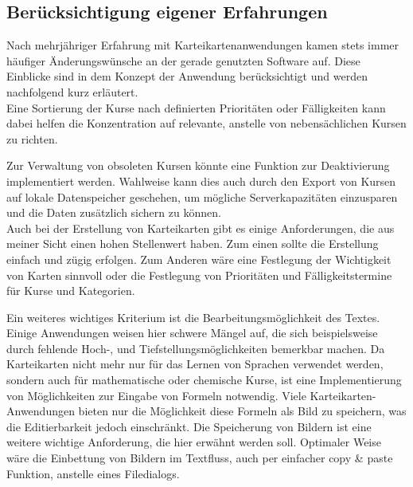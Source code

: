 
\subsection{Berücksichtigung eigener Erfahrungen}
Nach mehrjähriger Erfahrung mit Karteikartenanwendungen kamen stets immer häufiger Änderungswünsche an der gerade genutzten Software auf. Diese Einblicke sind in dem Konzept der Anwendung berücksichtigt und werden nachfolgend kurz erläutert. \\

Eine Sortierung der Kurse nach definierten Prioritäten oder Fälligkeiten kann dabei helfen die Konzentration auf relevante, anstelle von nebensächlichen Kursen zu richten.

Zur Verwaltung von obsoleten Kursen könnte eine Funktion zur Deaktivierung implementiert werden. Wahlweise kann dies auch durch den Export von Kursen auf lokale Datenspeicher geschehen, um mögliche Serverkapazitäten einzusparen und die Daten zusätzlich sichern zu können. \\

Auch bei der Erstellung von Karteikarten gibt es einige Anforderungen, die aus meiner Sicht einen hohen Stellenwert haben. Zum einen sollte die Erstellung einfach und zügig erfolgen. Zum Anderen wäre eine Festlegung der Wichtigkeit von Karten sinnvoll oder die Festlegung von Prioritäten und Fälligkeitstermine für Kurse und Kategorien. 

Ein weiteres wichtiges Kriterium ist die Bearbeitungsmöglichkeit des Textes. Einige Anwendungen weisen hier schwere Mängel auf, die sich beispielsweise durch fehlende Hoch-, und Tiefstellungsmöglichkeiten bemerkbar machen. Da Karteikarten nicht mehr nur für das Lernen von Sprachen verwendet werden, sondern auch für mathematische oder chemische Kurse, ist eine Implementierung von Möglichkeiten zur Eingabe von Formeln notwendig. Viele Karteikarten-Anwendungen bieten nur die Möglichkeit diese Formeln als Bild zu speichern, was die Editierbarkeit jedoch einschränkt. Die Speicherung von Bildern ist eine weitere wichtige Anforderung, die hier erwähnt werden soll. Optimaler Weise wäre die Einbettung von Bildern im Textfluss, auch per einfacher copy {\&} paste Funktion, anstelle eines Filedialogs. \\


